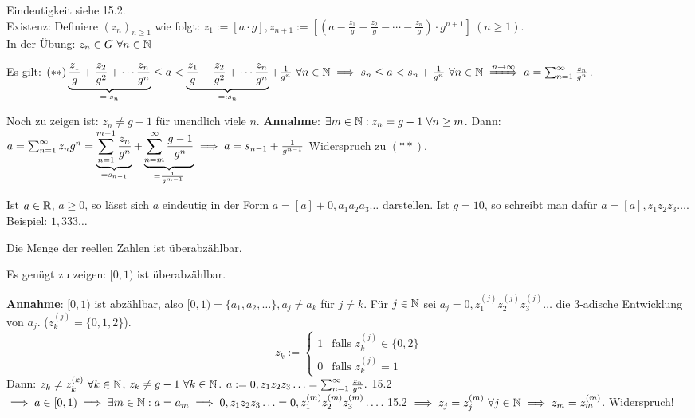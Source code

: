 \documentclass[a4paper,twoside,DIV15,BCOR12mm]{scrbook}
\begin{document}
\begin{beweis}
Eindeutigkeit siehe 15.2.\\
Existenz: Definiere $(z_n)_{n\ge1}$ wie folgt: $z_1:=[a\cdot g], z_{n+1} := [ ( a - \frac{z_1}{g} - \frac{z_2}{g} - \cdots -\frac{z_n}{g}) \cdot g^{n+1} ] \ (n\ge1)$. \\
In der Übung: $z_n \in G \ \forall n\in\mathbb{N}$

Es gilt: $(**) \underbrace{\frac{z_1}{g} + \frac{z_2}{g^2} + \cdots \frac{z_n}{g^n}}_{=: s_n} \le a < \underbrace{\frac{z_1}{g} + \frac{z_2}{g^2} + \cdots \frac{z_n}{g^n}}_{=: s_n} + \frac{1}{g^n} \ \forall n\in\MdN \folgt s_n \le a < s_n + \frac{1}{g^n} \ \forall n\in\MdN \folgtwegen{n\to\infty} a = \reihe{\frac{z_n}{g^n}}$.

Noch zu zeigen ist: $z_n \ne g-1$ für unendlich viele $n$.
\textbf{Annahme}: $\exists{m\in\ensuremath{\mathbb{N}}}: z_n = g-1 \ \forall n\ge m$.  Dann: $a = \sum_{n=1}^{\infty}{z_n}{g^n} = \underbrace{\sum_{n=1}^{m-1}{\frac{z_n}{g^n}}}_{= s_{n-1}} + \underbrace{\sum_{n=m}^\infty{\frac{g-1}{g^n}}}_{= \frac{1}{g^{m-1}}} \implies a = s_{n-1} + \frac{1}{g^{n-1}}$ Widerspruch zu $(**)$.
\end{beweis}

\begin{bemerkung}
Ist $a\in\mathbb{R}$, $a\ge0$, so lässt sich $a$ eindeutig in der Form $a = [a]+0,a_1a_2a_3\ldots$ darstellen. Ist $g=10$, so schreibt man dafür $a=[a],z_1z_2z_3\ldots$. Beispiel: $1,333\ldots$
\end{bemerkung}

\begin{satz}
Die Menge der reellen Zahlen ist überabzählbar.
\end{satz}

\begin{beweis}
Es genügt zu zeigen: $[0,1)$ ist überabzählbar.

\textbf{Annahme}: $[0,1)$ ist abzählbar, also $[0,1) = \{a_1,a_2,\ldots\}, a_j \ne a_k$ für $j\ne k$. 
F\"ur $j \in\mathbb{N}$ sei $a_j = 0,z_1^{(j)} z_2^{(j)} z_3^{(j)}\ldots$ die 3-adische Entwicklung von $a_j$. ($z_k^{(j)} = \{0,1,2\}$).
$$ z_k := \begin{cases} 1 & \text{falls } z_k^{(j)} \in \{0,2\} \\0 & \text{falls } z_k^{(j)}= 1 \end{cases}$$
Dann: $z_k \ne z_k^{(k)} \ \forall k \in\mathbb{N}$, $z_k \ne g-1 \ \forall k\in\mathbb{N}$. $a := 0,z_1z_2z_3\ldots = \sum_{n=1}^{\infty}{\frac{z_n}{g^n}}.$ 15.2 $\implies a \in [0,1) \implies \exists m\in\mathbb{N}: a= a_m \implies 0,z_1z_2z_3\ldots = 0,z_1^{(m)}z_2^{(m)}z_3^{(m)}\ldots$. 15.2 $\implies z_j = z_j^{(m)} \ \forall j\in\mathbb{N} \implies z_m = z_m^{(m)}$. Widerspruch!
\end{beweis}
\end{document}
